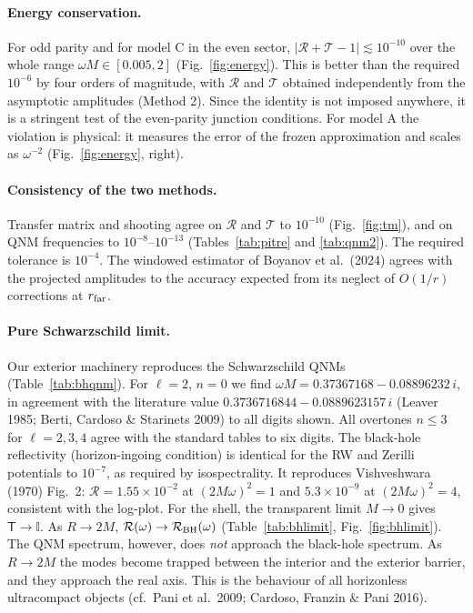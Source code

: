\documentclass[11pt,a4paper]{article}
\numberwithin{equation}{section}
\begin{document}
\begin{table}[h]\centering\small
\caption{Validation summary. M1/M2 denote the transfer-matrix and shooting methods.
$|\Delta_{12}|$ is the maximum difference between them over the frequency grid
$\omega M\in[0.005,2]$.}\label{tab:valid}

\end{table}

\paragraph{Energy conservation.} For odd parity and for model C in the even sector,
$|\mathcal R+\mathcal T-1|\lesssim10^{-10}$ over the whole range $\omega M\in[0.005,2]$
(Fig.~\ref{fig:energy}). This is better than the required $10^{-6}$ by four orders of magnitude, with
$\mathcal R$ and $\mathcal T$ obtained independently from the asymptotic amplitudes (Method 2). Since the
identity is not imposed anywhere, it is a stringent test of the even-parity junction conditions. For
model A the violation is physical: it measures the error of the frozen approximation and scales as
$\omega^{-2}$ (Fig.~\ref{fig:energy}, right).

\paragraph{Consistency of the two methods.} Transfer matrix and shooting agree on $\mathcal R$ and
$\mathcal T$ to $10^{-10}$ (Fig.~\ref{fig:tm}), and on QNM frequencies to $10^{-8}$--$10^{-13}$
(Tables~\ref{tab:pitre} and \ref{tab:qnm2}). The required tolerance is $10^{-4}$. The
windowed estimator of Boyanov et al.\ (2024) agrees with the projected amplitudes to the accuracy expected
from its neglect of $O(1/r)$ corrections at $r_{\rm far}$.

\paragraph{Pure Schwarzschild limit.} Our exterior machinery reproduces the Schwarzschild QNMs
(Table~\ref{tab:bhqnm}). For $\ell=2$, $n=0$ we find $\omega M=0.37367168-0.08896232\,i$, in agreement with
the literature value $0.3736716844-0.0889623157\,i$ (Leaver 1985; Berti, Cardoso \& Starinets 2009) to all
digits shown. All overtones $n\le3$ for $\ell=2,3,4$ agree with the standard tables to six digits. The
black-hole reflectivity (horizon-ingoing condition) is identical for the RW and Zerilli potentials to
$10^{-7}$, as required by isospectrality. It reproduces Vishveshwara (1970) Fig.~2: $\mathcal R=1.55\times10^{-2}$
at $(2M\omega)^2=1$ and $5.3\times10^{-9}$ at $(2M\omega)^2=4$, consistent with the log-plot. For the shell,
the transparent limit $M\to0$ gives $\mathsf T\to\mathbb{I}$. As $R\to2M$, $\mathcal R(\omega)\to\mathcal R_{\rm BH}(\omega)$
(Table~\ref{tab:bhlimit}, Fig.~\ref{fig:bhlimit}). The QNM spectrum, however, does \emph{not} approach the
black-hole spectrum. As $R\to2M$ the modes become trapped between the interior and the exterior barrier, and
they approach the real axis. This is the behaviour of all horizonless ultracompact objects (cf.\ Pani et al.\
2009; Cardoso, Franzin \& Pani 2016).
\end{document}
